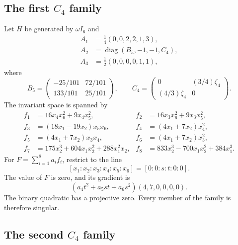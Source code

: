 \documentclass[12pt]{amsart}
\numberwithin{equation}{section}
\theoremstyle{plain}
\theoremstyle{definition}
\theoremstyle{remark}
\DeclareMathOperator{\diag}{diag}
\begin{document}
\subsection{The first $C_4$ family}

Let $H$ be generated by $\omega I_6$ and
\begin{align*}
 A_1&=\frac14(0,0,2,2,1,3),\\
 A_2&=\diag(B_5,-1,-1,C_4),\\
 A_3&=\frac12(0,0,0,0,1,1),
\end{align*}
where
\[
 B_5=\begin{pmatrix}-25/101&72/101\\133/101&25/101\end{pmatrix},
 \qquad
 C_4=\begin{pmatrix}0&(3/4)\zeta _4\\(4/3)\zeta _4&0\end{pmatrix}.
\]
The invariant space is spanned by
\begin{align*}
 f_1&=16x_4x_6^2+9x_4x_5^2,&
 f_2&=16x_3x_6^2+9x_3x_5^2,\\
 f_3&=(18x_1-19x_2)x_5x_6,&
 f_4&=(4x_1+7x_2)x_4^2,\\
 f_5&=(4x_1+7x_2)x_3x_4,&
 f_6&=(4x_1+7x_2)x_3^2,\\
 f_7&=175x_2^3+604x_1x_2^2+288x_1^2x_2,&
 f_8&=833x_2^3-700x_1x_2^2+384x_1^3.
\end{align*}
For $F=\sum_{i=1}^8a_if_i$, restrict to the line
\[
 [x_1:x_2:x_3:x_4:x_5:x_6]=[0:0:s:t:0:0].
\]
The value of $F$ is zero, and its gradient is
\[
 (a_4t^2+a_5st+a_6s^2)(4,7,0,0,0,0).
\]
The binary quadratic has a projective zero.  Every member of the family is
therefore singular.

\subsection{The second $C_4$ family}
\end{document}
